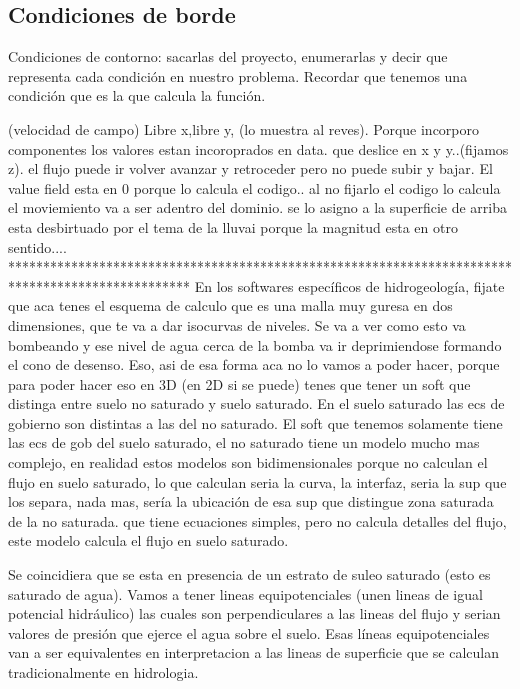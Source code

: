 \documentclass[10pt,a4paper,final]{article}
\begin{document}
%
\subsection{Condiciones de borde}
Condiciones de contorno: sacarlas del proyecto, enumerarlas y decir
que representa cada condición en nuestro problema. Recordar que
tenemos una condición que es la que calcula la función.

(velocidad de campo) Libre x,libre y,  (lo muestra al reves). Porque incorporo componentes los valores estan incoroprados en data.
que deslice en x y y..(fijamos z).
el flujo puede ir volver avanzar y retroceder pero no puede subir y bajar. El value field esta en 0 porque lo calcula el codigo.. al no fijarlo el codigo lo calcula
el moviemiento va a ser adentro del dominio. se lo asigno  a la superficie de arriba
esta desbirtuado por el tema de la lluvai porque la magnitud esta en otro sentido....
**************************************************************************************************
En los softwares específicos de hidrogeología, fijate que aca tenes el esquema de calculo que es una malla muy guresa en dos dimensiones, que te va a dar isocurvas de niveles. Se va a ver como esto va bombeando y ese nivel de agua cerca de la bomba va ir deprimiendose formando el cono de desenso. Eso, asi de esa forma aca no lo vamos a poder hacer, porque para poder hacer eso en 3D (en 2D si se puede) tenes que tener un soft que distinga entre suelo no saturado y suelo saturado. En el suelo saturado las ecs de gobierno son distintas a las del no saturado. El soft que tenemos solamente tiene las ecs de gob del suelo saturado, el no saturado tiene un modelo mucho mas complejo, en realidad estos modelos son bidimensionales porque no calculan el flujo en suelo saturado, lo que calculan seria la curva, la interfaz, seria la sup que los separa, nada mas, sería la ubicación de esa sup que distingue zona saturada de la no saturada. que tiene ecuaciones simples, pero no calcula detalles del flujo, este modelo calcula el flujo en suelo saturado. 

Se coincidiera que se esta en presencia de un estrato de suleo saturado (esto es saturado de agua). 
Vamos a tener lineas equipotenciales (unen lineas de igual potencial hidráulico) las cuales son perpendiculares a las lineas del flujo y serian valores de presión que ejerce el agua sobre el suelo. Esas líneas equipotenciales van a ser equivalentes en interpretacion a las lineas de superficie que se calculan tradicionalmente en hidrologia.
\end{document}
